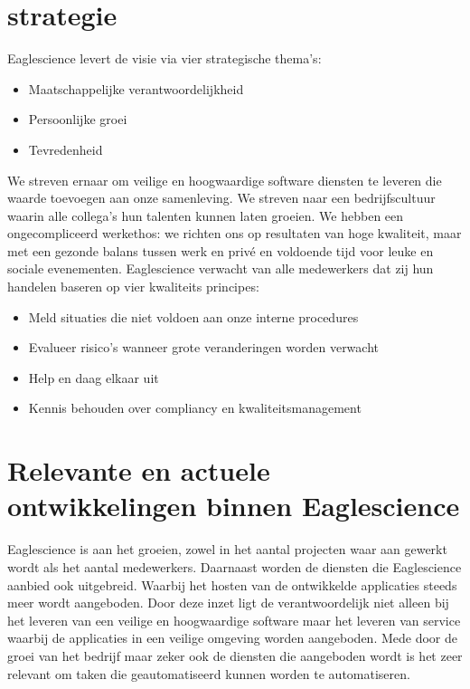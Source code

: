 \section{strategie}
Eaglescience levert de visie via vier strategische thema's:
\begin{itemize}
\item Maatschappelijke verantwoordelijkheid
\item Persoonlijke groei
\item Tevredenheid
\end{itemize}
We streven ernaar om veilige en hoogwaardige software diensten te leveren die waarde toevoegen aan onze samenleving. We streven naar een bedrijfscultuur waarin alle collega's hun talenten kunnen laten groeien. We hebben een ongecompliceerd werkethos: we richten ons op resultaten van hoge kwaliteit, maar met een gezonde balans tussen werk en priv\'e en voldoende tijd voor leuke en sociale evenementen. Eaglescience verwacht van alle medewerkers dat zij hun handelen baseren op vier kwaliteits principes:
\begin{itemize}
\item Meld situaties die niet voldoen aan onze interne procedures
\item Evalueer risico's wanneer grote veranderingen worden verwacht
\item Help en daag elkaar uit
\item Kennis behouden over compliancy en kwaliteitsmanagement
\end{itemize} 
\section{Relevante en actuele ontwikkelingen binnen Eaglescience}
Eaglescience is aan het groeien, zowel in het aantal projecten waar aan gewerkt wordt als het aantal medewerkers. Daarnaast worden de diensten die Eaglescience aanbied ook uitgebreid. Waarbij het hosten van de ontwikkelde applicaties steeds meer wordt aangeboden. Door deze inzet ligt de verantwoordelijk niet alleen bij het leveren van een veilige en hoogwaardige software maar het leveren van service waarbij de applicaties in een veilige omgeving worden aangeboden. Mede door de groei van het bedrijf maar zeker ook de diensten die aangeboden wordt is het zeer relevant om taken die geautomatiseerd kunnen worden te automatiseren.
